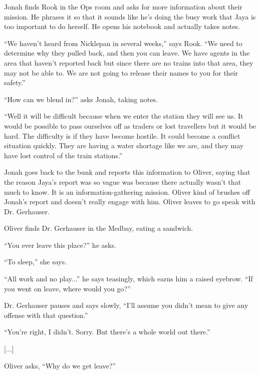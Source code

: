 
Jonah finds Rook in the Ops room and asks for more information about their mission.  He phrases it so that it sounds like he's doing the busy work that Jaya is too important to do herself.  He opens his notebook and actually takes notes.



``We haven't heard from Nicklepan in several weeks,'' says Rook.  ``We need to determine why they pulled back, and then you can leave.  We have agents in the area that haven't reported back but since there are no trains into that area, they may not be able to.  We are not going to release their names to you for their safety.''



``How can we blend in?'' asks Jonah, taking notes.

``Well it will be difficult because when we enter the station they will see us.  It would be possible to pass ourselves off as traders or lost travellers but it would be hard.  The difficulty is if they have become hostile.  It could become a conflict situation quickly.  They are having a water shortage like we are, and they may have lost control of the train stations.''



Jonah goes back to the bunk and reports this information to Oliver, saying that the reason Jaya's report was so vague was because there actually wasn't that much to know.  It is an information-gathering mission.  Oliver kind of brushes off Jonah's report and doesn't really engage with him.  Oliver leaves to go speak with Dr. Gerhauser.



Oliver finds Dr. Gerhauser in the Medbay, eating a sandwich.

``You ever leave this place?'' he asks.

``To sleep,'' she says.

``All work and no play...'' he says teasingly, which earns him a raised eyebrow. ``If you went on leave, where would you go?''

Dr. Gerhauser pauses and says slowly, ``I'll assume you didn't mean to give any offense with that question.''

``You're right, I didn't.  Sorry.  But there's a whole world out there.''  

{[}...{]}

Oliver asks, ``Why do we get leave?''

